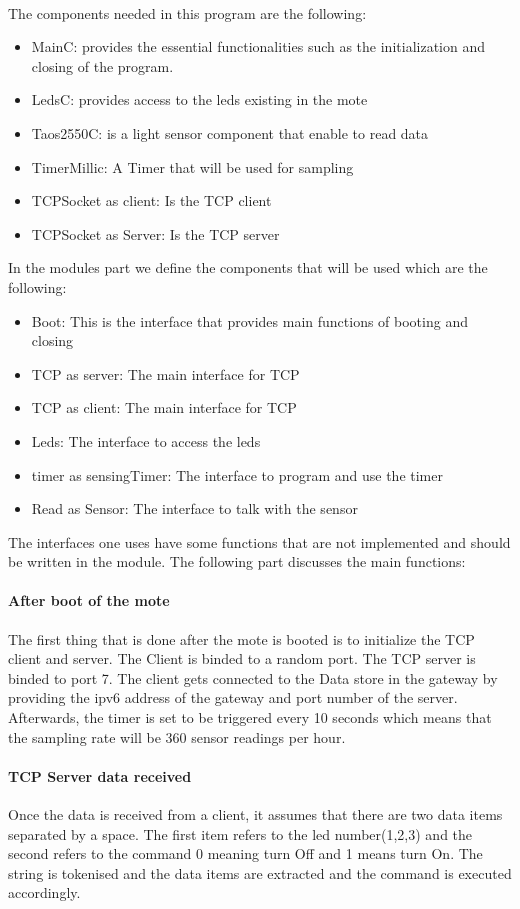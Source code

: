 \documentclass[oneside,12pt,a4paper,final]{book}
\begin{document}
\paragraph{}
The components needed in this program are the following:
\begin{itemize}
\item MainC: provides the essential functionalities such as the initialization and closing of the program.
\item LedsC: provides access to the leds existing in the mote
\item Taos2550C: is a light sensor component that enable to read data
\item TimerMillic: A Timer that will be used for sampling
\item TCPSocket as client: Is the TCP client
\item TCPSocket as Server: Is the TCP server
\end{itemize}
In the modules part we define the components that will be used which are the following:
\begin{itemize}
\item Boot: This is the interface that provides main functions of booting and closing
\item TCP as server: The main interface for TCP
\item TCP as client: The main interface for TCP
\item Leds: The interface to access the leds
\item timer as sensingTimer: The interface to program and use the timer
\item Read as Sensor: The interface to talk with the sensor
\end{itemize}
The interfaces one uses have some functions that are not implemented and should be written in the module. The following part discusses the main functions:
\paragraph{After boot of the mote}
The first thing that is done after the mote is booted is to initialize the TCP client and server. The Client is binded to a random port. The TCP server is binded to port 7. The client gets connected to the Data store in the gateway by providing the \gls{ipv6} address of the gateway and port number of the server. Afterwards, the timer is set to be triggered every 10 seconds which means that the sampling rate will be 360 sensor readings per hour. 
\paragraph{TCP Server data received}
Once the data is received from a client, it assumes that there are two data items separated by a space. The first item refers to the led number(1,2,3) and the second refers to the command 0 meaning turn Off and 1 means turn On. The string is tokenised and the data items are extracted and the command is executed accordingly.
\end{document}
